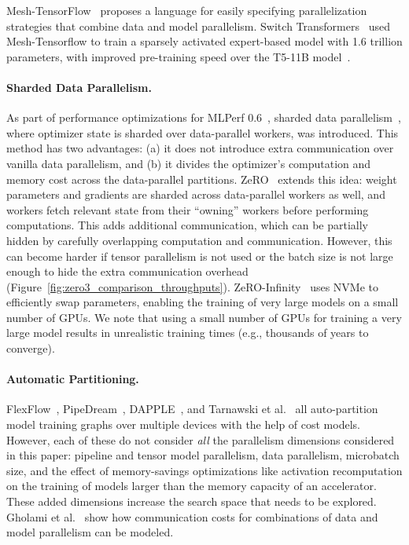 Mesh-TensorFlow~\cite{mesh_tf} proposes a language for easily specifying parallelization strategies that combine data and model parallelism. Switch Transformers~\cite{fedus2021switch} used Mesh-Tensorflow to train a sparsely activated expert-based model with 1.6 trillion parameters, with improved pre-training speed over the T5-11B model~\cite{T5}.

\paragraph{Sharded Data Parallelism.} As part of performance optimizations for MLPerf 0.6~\cite{mattson2019mlperf}, sharded data parallelism~\cite{kumar2019scale, xu2020automatic}, where optimizer state is sharded over data-parallel workers, was introduced. This method has two advantages: (a) it does not introduce extra communication over vanilla data parallelism, and (b) it divides the optimizer's computation and memory cost across the data-parallel partitions. ZeRO~\cite{rajbhandari2019zero,rajbhandari2021zero} extends this idea: weight parameters and gradients are sharded across data-parallel workers as well, and workers fetch relevant state from their ``owning'' workers before performing computations. This adds additional communication, which can be partially hidden by carefully overlapping computation and communication. However, this can become harder if tensor parallelism is not used or the batch size is not large enough to hide the extra communication overhead (Figure~\ref{fig:zero3_comparison_throughputs}). ZeRO-Infinity~\cite{rajbhandari2021zero} uses NVMe to efficiently swap parameters, enabling the training of very large models on a small number of GPUs. We note that using a small number of GPUs for training a very large model results in unrealistic training times (e.g., thousands of years to converge).


\paragraph{Automatic Partitioning.} FlexFlow~\cite{flexflow}, PipeDream~\cite{narayanan2019pipedream}, DAPPLE~\cite{fan2021dapple}, and Tarnawski et al.~\cite{tarnawski2020efficient} all auto-partition model training graphs over multiple devices with the help of cost models. However, each of these do not consider \emph{all} the parallelism dimensions considered in this paper: pipeline and tensor model parallelism, data parallelism, microbatch size, and the effect of memory-savings optimizations like activation recomputation on the training of models larger than the memory capacity of an accelerator. These added dimensions increase the search space that needs to be explored. Gholami et al.~\cite{gholami2018integrated} show how communication costs for combinations of data and model parallelism can be modeled.

